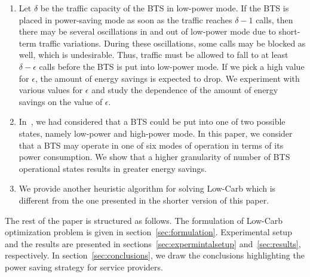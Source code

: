 \begin{enumerate}
\item Let $\delta$ be the traffic capacity of the BTS in low-power mode. If the BTS is placed in power-saving mode as soon as the traffic reaches $\delta - 1$ calls, then there may be several oscillations in and out of low-power mode due to short-term traffic variations. During these oscillations, some calls may be blocked as well, which is undesirable. Thus, traffic must be allowed to fall to at least $\delta - \epsilon$ calls before the BTS is put into low-power mode. If we pick a high value for $\epsilon$, the amount of energy savings is expected to drop. We experiment with various values for $\epsilon$ and study the dependence of the amount of energy savings on the value of $\epsilon$.
\item In~\cite{ilyas:lowcarb:globecom13}, we had considered that a BTS could be put into one of two possible states, namely low-power and high-power mode. In this paper, we consider that a BTS may operate in one of six modes of operation in terms of its power consumption. We show that a higher granularity of number of BTS operational states results in greater energy savings.
\item We provide another heuristic algorithm for solving Low-Carb which is different from the one presented in the shorter version of this paper.
\end{enumerate}
The rest of the paper is structured as follows. The formulation
of Low-Carb optimization problem is given in
section~\ref{sec:formulation}. Experimental setup and the
results are presented in sections~\ref{sec:expermintalsetup}
and~\ref{sec:results}, respectively. In
section~\ref{sec:conclusions}, we draw the conclusions
highlighting the power saving strategy for service providers.